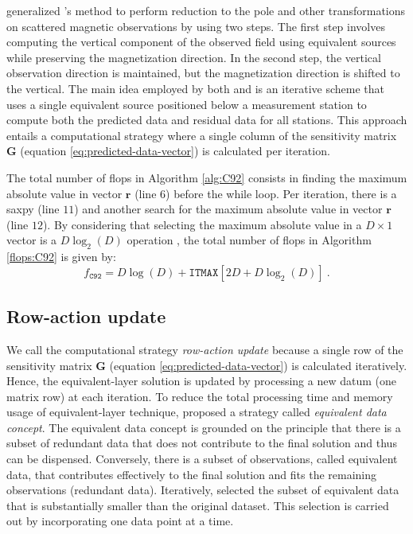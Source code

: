 \cite{guspi-novara2009} generalized \citeauthor{cordell1992}'s method to
perform reduction to the pole and other transformations on scattered magnetic observations by using two steps. 
The first step involves computing the vertical component of the observed field using equivalent sources while preserving the magnetization direction.
In the second step, the vertical observation direction is maintained, but the magnetization direction is shifted to the vertical.
The main idea employed by both \cite{cordell1992} and \cite{guspi-novara2009} is an iterative scheme that 
uses a single equivalent source positioned below a measurement station to compute both the predicted data and residual data for all stations. 
This approach entails a computational strategy where a single column of the sensitivity matrix $\mathbf{G}$ (equation \ref{eq:predicted-data-vector}) 
is calculated per iteration.

The total number of flops in Algorithm \ref{alg:C92} consists in 
finding the maximum absolute value in vector $\mathbf{r}$ (line $6$) before the while loop. 
Per iteration, there is a saxpy (line $11$) and 
another search for the maximum absolute value in vector $\mathbf{r}$ (line $12$).
By considering that selecting the maximum absolute value in a $D \times 1$ vector is a $D \log_{2}(D)$ operation \citep[e.g.,][p. 420]{press-etal2007},
the total number of flops in Algorithm \ref{flops:C92} is given by:
\begin{equation}
	f_{\mathtt{C92}} = D \log(D) + \mathtt{ITMAX} \left[2D + D \log_{2}(D) \right] \: .
	\label{flops:C92}
\end{equation}

\subsection{Row-action update}

We call the computational strategy \textit{row-action update} because a single row of the sensitivity matrix  
$\mathbf{G}$ (equation \ref{eq:predicted-data-vector}) is calculated iteratively.
Hence, the equivalent-layer solution is updated by processing a new datum (one matrix row) at each iteration.
To reduce the total processing time and memory usage of equivalent-layer technique, \cite{mendonca-silva1994} proposed 
a strategy called \textit{equivalent data concept}.
The equivalent data concept is grounded on the  principle  that there is a subset of redundant data that does not 
contribute to the final solution and thus can be dispensed.
Conversely, there is a subset of observations, called equivalent data, that  contributes effectively to the 
final solution and fits the remaining observations (redundant data).
Iteratively, \cite{mendonca-silva1994} selected the subset of equivalent data that is substantially smaller than 
the original dataset. 
This selection is carried out by incorporating one data point at a time.

